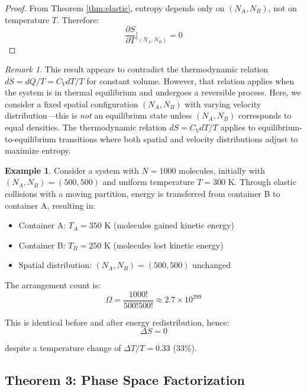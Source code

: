 \documentclass[10pt,twocolumn,letterpaper]{article}
\theoremstyle{definition}
\newtheorem{example}[theorem]{Example}
\theoremstyle{remark}
\newtheorem{remark}[theorem]{Remark}
\newcommand{\pderiv}[2]{\frac{\partial #1}{\partial #2}}
\newcommand{\Om}{\Omega}
\begin{document}
\begin{proof}
From Theorem \ref{thm:elastic}, entropy depends only on $(N_A, N_B)$, not on temperature $T$. Therefore:
\begin{equation}
\pderiv{S}{T}\bigg|_{(N_A,N_B)} = 0
\end{equation}
\end{proof}

\begin{remark}
This result appears to contradict the thermodynamic relation $dS = dQ/T = C_V dT/T$ for constant volume. However, that relation applies when the system is in thermal equilibrium and undergoes a reversible process. Here, we consider a fixed spatial configuration $(N_A, N_B)$ with varying velocity distribution—this is \textit{not} an equilibrium state unless $(N_A, N_B)$ corresponds to equal densities. The thermodynamic relation $dS = C_V dT/T$ applies to equilibrium-to-equilibrium transitions where both spatial and velocity distributions adjust to maximize entropy.
\end{remark}

\begin{example}
Consider a system with $N = 1000$ molecules, initially with $(N_A, N_B) = (500, 500)$ and uniform temperature $T = 300$ K. Through elastic collisions with a moving partition, energy is transferred from container B to container A, resulting in:
\begin{itemize}
\item Container A: $T_A = 350$ K (molecules gained kinetic energy)
\item Container B: $T_B = 250$ K (molecules lost kinetic energy)
\item Spatial distribution: $(N_A, N_B) = (500, 500)$ unchanged
\end{itemize}

The arrangement count is:
\begin{equation}
\Om = \frac{1000!}{500! 500!} \approx 2.7 \times 10^{299}
\end{equation}

This is identical before and after energy redistribution, hence:
\begin{equation}
\Delta S = 0
\end{equation}

despite a temperature change of $\Delta T/T = 0.33$ (33\%).
\end{example}

\subsection{Theorem 3: Phase Space Factorization}
\end{document}
